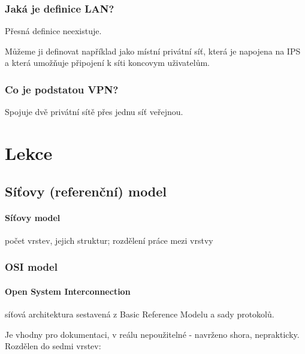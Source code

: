 \documentclass[10pt,a4paper]{article}
\begin{document}
\subsubsection{Jaká je definice LAN?}
Přesná definice neexistuje. 

Můžeme ji definovat například jako místní privátní síť, která je napojena na IPS a která umožňuje připojení k síti koncovym uživatelům.

\subsubsection{Co je podstatou VPN?}

Spojuje dvě privátní sítě přes jednu síť veřejnou.

\newpage

\section{Lekce}

\subsection{Síťovy (referenční) model}

\paragraph{Síťovy model} počet vrstev, jejich struktur; rozdělení práce mezi vrstvy

\subsubsection{OSI model}

\paragraph{Open System Interconnection} síťová architektura sestavená z Basic Reference Modelu a sady protokolů. 

Je vhodny pro dokumentaci, v reálu nepoužitelné - navrženo shora, neprakticky. Rozdělen do sedmi vrstev:
\end{document}
